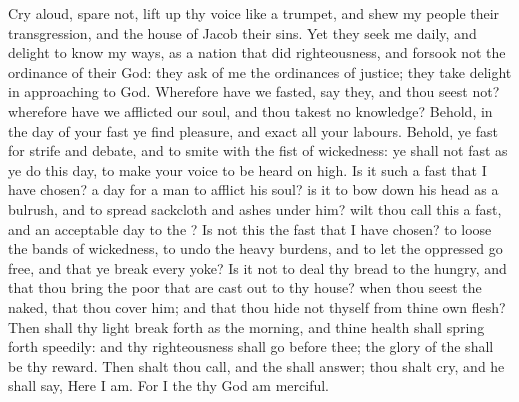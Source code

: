  Cry aloud, spare not, lift up thy voice like a trumpet, and shew my people their transgression, and the house of Jacob their sins. Yet they seek me daily, and delight to know my ways, as a nation that did righteousness, and forsook not the ordinance of their God: they ask of me the ordinances of justice; they take delight in approaching to God. Wherefore have we fasted, say they, and thou seest not? wherefore have we afflicted our soul, and thou takest no knowledge? Behold, in the day of your fast ye find pleasure, and exact all your labours. Behold, ye fast for strife and debate, and to smite with the fist of wickedness: ye shall not fast as ye do this day, to make your voice to be heard on high. Is it such a fast that I have chosen? a day for a man to afflict his soul? is it to bow down his head as a bulrush, and to spread sackcloth and ashes under him? wilt thou call this a fast, and an acceptable day to the ? Is not this the fast that I have chosen? to loose the bands of wickedness, to undo the heavy burdens, and to let the oppressed go free, and that ye break every yoke? Is it not to deal thy bread to the hungry, and that thou bring the poor that are cast out to thy house? when thou seest the naked, that thou cover him; and that thou hide not thyself from thine own flesh? Then shall thy light break forth as the morning, and thine health shall spring forth speedily: and thy righteousness shall go before thee; the glory of the  shall be thy reward. Then shalt thou call, and the  shall answer; thou shalt cry, and he shall say, Here I am. For I the  thy God am merciful.



